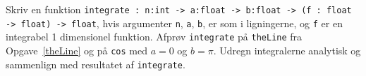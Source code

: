Skriv en funktion \lstinline{integrate : n:int -> a:float -> b:float -> (f : float -> float) -> float}, hvis argumenter \lstinline{n}, \lstinline{a}, \lstinline{b}, er som i ligningerne, og \lstinline{f} er en integrabel 1 dimensionel funktion. Afprøv \lstinline{integrate} på \lstinline{theLine} fra Opgave~\ref{theLine} og på \lstinline{cos} med $a=0$ og $b=\pi$. Udregn integralerne analytisk og sammenlign med resultatet af \lstinline{integrate}.